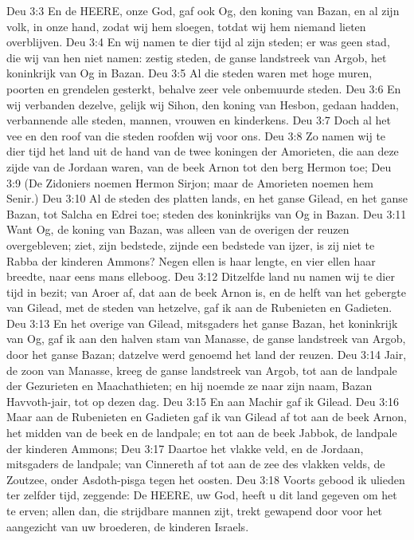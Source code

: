 Deu 3:3  En de HEERE, onze God, gaf ook Og, den koning van Bazan, en al zijn volk, in onze hand, zodat wij hem sloegen, totdat wij hem niemand lieten overblijven.
Deu 3:4  En wij namen te dier tijd al zijn steden; er was geen stad, die wij van hen niet namen: zestig steden, de ganse landstreek van Argob, het koninkrijk van Og in Bazan.
Deu 3:5  Al die steden waren met hoge muren, poorten en grendelen gesterkt, behalve zeer vele onbemuurde steden.
Deu 3:6  En wij verbanden dezelve, gelijk wij Sihon, den koning van Hesbon, gedaan hadden, verbannende alle steden, mannen, vrouwen en kinderkens.
Deu 3:7  Doch al het vee en den roof van die steden roofden wij voor ons.
Deu 3:8  Zo namen wij te dier tijd het land uit de hand van de twee koningen der Amorieten, die aan deze zijde van de Jordaan waren, van de beek Arnon tot den berg Hermon toe;
Deu 3:9  (De Zidoniers noemen Hermon Sirjon; maar de Amorieten noemen hem Senir.)
Deu 3:10  Al de steden des platten lands, en het ganse Gilead, en het ganse Bazan, tot Salcha en Edrei toe; steden des koninkrijks van Og in Bazan.
Deu 3:11  Want Og, de koning van Bazan, was alleen van de overigen der reuzen overgebleven; ziet, zijn bedstede, zijnde een bedstede van ijzer, is zij niet te Rabba der kinderen Ammons? Negen ellen is haar lengte, en vier ellen haar breedte, naar eens mans elleboog.
Deu 3:12  Ditzelfde land nu namen wij te dier tijd in bezit; van Aroer af, dat aan de beek Arnon is, en de helft van het gebergte van Gilead, met de steden van hetzelve, gaf ik aan de Rubenieten en Gadieten.
Deu 3:13  En het overige van Gilead, mitsgaders het ganse Bazan, het koninkrijk van Og, gaf ik aan den halven stam van Manasse, de ganse landstreek van Argob, door het ganse Bazan; datzelve werd genoemd het land der reuzen.
Deu 3:14  Jair, de zoon van Manasse, kreeg de ganse landstreek van Argob, tot aan de landpale der Gezurieten en Maachathieten; en hij noemde ze naar zijn naam, Bazan Havvoth-jair, tot op dezen dag.
Deu 3:15  En aan Machir gaf ik Gilead.
Deu 3:16  Maar aan de Rubenieten en Gadieten gaf ik van Gilead af tot aan de beek Arnon, het midden van de beek en de landpale; en tot aan de beek Jabbok, de landpale der kinderen Ammons;
Deu 3:17  Daartoe het vlakke veld, en de Jordaan, mitsgaders de landpale; van Cinnereth af tot aan de zee des vlakken velds, de Zoutzee, onder Asdoth-pisga tegen het oosten.
Deu 3:18  Voorts gebood ik ulieden ter zelfder tijd, zeggende: De HEERE, uw God, heeft u dit land gegeven om het te erven; allen dan, die strijdbare mannen zijt, trekt gewapend door voor het aangezicht van uw broederen, de kinderen Israels.
